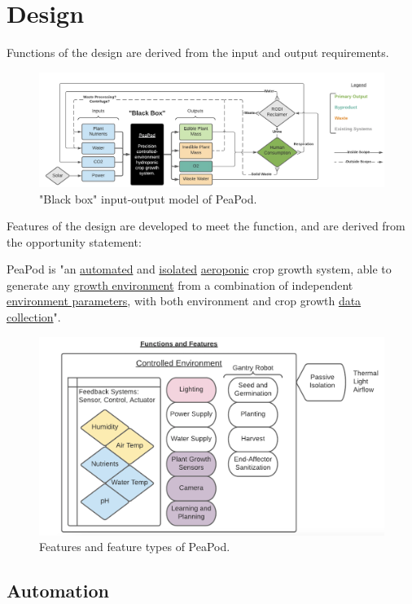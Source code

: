 \documentclass{report}
\begin{document}
\newpage

\section{Design}

Functions of the design are derived from the input and output requirements.

\begin{figure}[h]
    \centering
    \includegraphics[width=15cm]{images/blackbox.png}
    \hfill
    \caption{"Black box" input-output model of PeaPod.}
\end{figure}

Features of the design are developed to meet the function, and are derived from the opportunity statement:

PeaPod is "an \uline{automated} and \uline{isolated} \uline{aeroponic} crop growth system, able to generate any \uline{growth environment} from a combination of independent \uline{environment parameters}, with both environment and crop growth \uline{data collection}".

\begin{figure}[h]
    \centering
    \includegraphics[width=12cm]{images/features.png}
    \hfill
    \caption{Features and feature types of PeaPod.}
\end{figure}

\newpage

\subsection{Automation}
\label{sec:automation}
\end{document}
